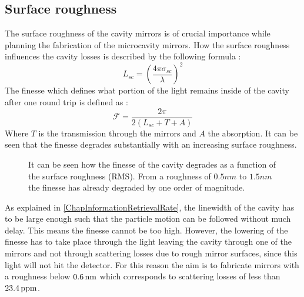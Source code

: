 \subsection{Surface roughness}
The surface roughness of the cavity mirrors is of crucial importance while planning the fabrication of the microcavity mirrors. How the surface roughness influences the cavity losses is described by the following formula \cite{roy2011fabrication}:
\begin{equation}
	L_{\si{sc}}=\left(\frac{4\pi\sigma_{\si{sc}}}{\lambda}\right)^2
\end{equation}
The finesse which defines what portion of the light remains inside of the cavity after one round trip is defined as \cite{roy2011fabrication}:
\begin{equation}
	\mathcal{F}=\frac{2\pi}{2(L_{\si{sc}}+T+A)}
\end{equation}
Where $T$ is the transmission through the mirrors and $A$ the absorption. It can be seen that the finesse degrades substantially with an increasing surface roughness.
\begin{figure}[H]
	
	\caption{It can be seen how the finesse of the cavity degrades as a function of the surface roughness (RMS). From a roughness of $0.5\si{nm}$ to $1.5\si{nm}$ the finesse has already degraded by one order of magnitude.}
\end{figure}
As explained in \autoref{ChapInformationRetrievalRate}, the linewidth of the cavity has to be large enough such that the particle motion can be followed without much delay. This means the finesse cannot be too high. However, the lowering of the finesse has to take place through the light leaving the cavity through one of the mirrors and not through scattering losses due to rough mirror surfaces, since this light will not hit the detector. For this reason the aim is to fabricate mirrors with a roughness below $0.6\nm$ which corresponds to scattering losses of less than $23.4\ppm$.

